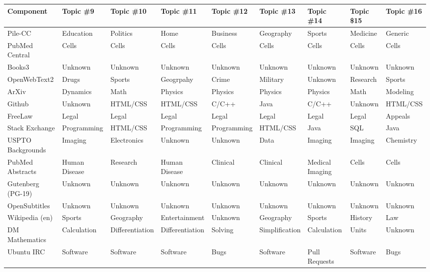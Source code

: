 \documentclass[11pt,a4paper]{article}
\begin{document}
\begin{appendices}
\begin{table*}[htb]
\begin{tiny}
\begin{tabular}{|p{}|p{}p{}p{}p{}p{}p{}p{}p{}|}
\hline
Component & Topic \#9 & Topic \#10 & Topic \#11 & Topic \#12 & Topic \#13 & Topic \#14 & Topic \$15 & Topic \#16\\\hline
Pile-CC & Education & Politics & Home & Business & Geography & Sports & Medicine & Generic\\\hline
    PubMed Central & Cells & Cells & Cells & Cells & Cells & Cells & Cells & Cells\\\hline
    Books3 & Unknown & Unknown & Unknown & Unknown & Unknown & Unknown & Unknown & Unknown\\\hline
    OpenWebText2 & Drugs & Sports & Geogrpahy & Crime & Military & Unknown & Research & Sports\\\hline
    ArXiv & Dynamics & Math & Physics & Physics & Physics & Physics & Math & Modeling\\\hline
    Github & Unknown & HTML/CSS & HTML/CSS & C/C++ & Java & C/C++ & Unknown & HTML/CSS\\\hline
    FreeLaw & Legal & Legal & Legal & Legal & Legal & Legal & Legal & Appeals\\\hline
    Stack Exchange & Programming & HTML/CSS & Programming & Programming & HTML/CSS & Java & SQL & Java\\\hline
    USPTO Backgrounds & Imaging & Electronics & Unknown & Unknown & Data & Imaging & Imaging & Chemistry\\\hline
    PubMed Abstracts & Human Disease & Research & Human Disease & Clinical & Clinical & Medical Imaging & Cells & Cells\\\hline
    Gutenberg (PG-19) & Unknown & Unknown & Unknown & Unknown & Unknown & Unknown & Unknown & Unknown\\\hline
    OpenSubtitles & Unknown & Unknown & Unknown & Unknown & Unknown & Unknown & Unknown & Unknown\\\hline
    Wikipedia (en) & Sports & Geography & Entertainment & Unknown & Geography & Sports & History & Law\\\hline
    DM Mathematics & Calculation & Differentiation & Differentiation & Solving & Simplification & Calculation & Units & Unknown\\\hline
    Ubuntu IRC & Software & Software & Software & Bugs & Software & Pull Requests & Software & Bugs\\\hline

\end{tabular}
\end{tiny}
\end{table*}
\end{appendices}
\end{document}
